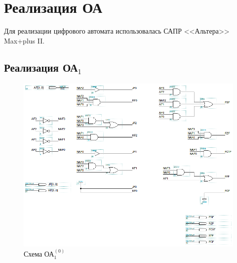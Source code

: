 
\newpage
\section{Реализация ОА}

Для реализации цифрового автомата использовалась САПР <<Альтера>> Max+plus II.

\subsection{Реализация ОА${}_1$}

\begin{figure}[H]
	\includegraphics[scale=0.6]{images/altera/oa10_logic.png}
	\caption{Схема ОА$^{(0)}_{1}$}
	\label{figure:oa10log}
\end{figure}

